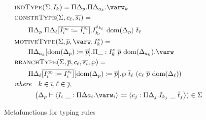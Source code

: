 \begin{figure}
\centering

\begin{align*}
    &\indtype{\Sigma}{I_k} = \Pi \Delta_p . \Pi \Delta_{a_k} . \varw_k \\
    &\constrtype{\Sigma}{c_\ell}{\overline{s_i}} = \\
    &\qquad \Pi \Delta_p . \Pi \Delta_\ell \overline{[I_i^\infty \coloneqq I_i^{s_i}]} . I_{k_\ell}^{\hat{s}_{k_\ell}}\ \dom{\Delta_p}\ \overline{t}_\ell \\
    &\motivetype{\Sigma}{\overline{p}}{\varw}{I_k^s} = \\
    &\qquad \Pi \Delta_{a_k}[\dom{\Delta_p} \coloneqq \overline{p}] . \Pi \_ : I_k^s\ \overline{p}\ \dom{\Delta_{a_k}} . \varw \\
    &\branchtype{\Sigma}{\overline{p}}{c_\ell}{\overline{s_i}}{\wp} = \\
    &\qquad \Pi \Delta_\ell \overline{[I_i^\infty \coloneqq I_i^{s_i}]}[\dom{\Delta_p} \coloneqq \overline{p}] . \wp\ \overline{t}_\ell\ (c_\ell\ \overline{p}\ \dom{\Delta_\ell}) \\
    &\textit{where}\quad k \in \overline{\imath}, \ell \in \overline{\jmath}, \\
    &\quad\qquad\big(\Delta_p \vdash \langle I_i\ \_ : \Pi\Delta{a_i} . \varw_i \rangle \coloneqq \langle c_j : \Pi \Delta_j . I_{k_j}\ \_\ \overline{t}_j \big \rangle) \in \Sigma
\end{align*}

\caption{Metafunctions for typing rules}
\label{fig:metafunctions}
\end{figure}